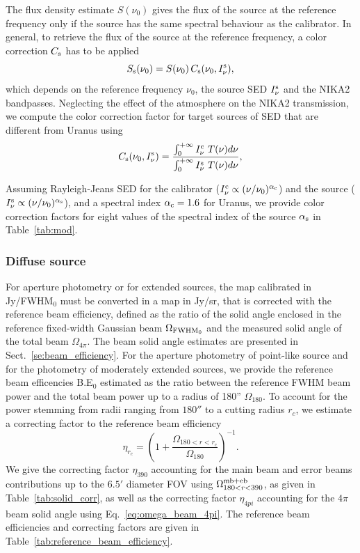 The flux density estimate $S(\nu_{0})$ gives the
flux of the source at the reference frequency only if the source has
the same spectral behaviour as the calibrator. In general, to retrieve the
flux of the source at the reference frequency, a color correction
$C_{\rm{s}}$ has to be applied
\begin{equation}
S_{\rm{s}}(\nu_{0}) = S(\nu_{0}) \,  C_{\rm{s}}(\nu_{0}, I_\nu^{\rm{s}}),
\end{equation}
which depends on the reference frequency $\nu_{0}$, the source
SED $I_\nu^{\rm{s}}$ and the NIKA2 bandpasses.
Neglecting the effect of the atmosphere on the NIKA2 transmission, we
compute the color correction factor for target sources of SED that are
different from Uranus using
\begin{equation}
  C_{\rm{s}}(\nu_{0}, I_\nu^{\rm{s}}) = \frac{\int_{0}^{+\infty} I_\nu^{\rm{c}}~T({\nu}) d\nu}{ \int_{0}^{+\infty} I_\nu^{\rm{s}}~ T({\nu}) d\nu},
    \label{eq:color_correction}
\end{equation}

Assuming Rayleigh-Jeans SED for the calibrator
($I_\nu^{\rm{c}} \propto (\nu/\nu_0)^{\alpha_{\rm{c}}}$) and the source
($I_\nu^{\rm{s}} \propto (\nu/\nu_0)^{\alpha_{\rm{s}}}$), and a
spectral index $\alpha_{\rm{c}} = 1.6$ for Uranus, we provide color
correction factors for eight values of the spectral index of the
source $\alpha_{\rm{s}}$ in Table~\ref{tab:mod}.


\subsubsection{Diffuse source}
\label{se:extended_source_calib}

For aperture photometry or for extended sources, the map calibrated in
Jy/FWHM$_{0}$ must be converted in a map in Jy/sr, that is corrected
with the reference beam efficiency, defined as the ratio of the solid
angle enclosed in the reference fixed-width Gaussian beam
$\Omega_{\rm{FWHM}_{0}}$ and the measured solid angle of the total
beam $\Omega_{4\pi}$. The beam solid angle estimates are
presented in Sect.~\ref{se:beam_efficiency}.
{\lp For the aperture photometry of point-like source and for the
photometry of moderately extended sources, we provide the reference
beam efficencies B.E$_{0}$ estimated as the ratio between the
reference FWHM beam power and the total beam power up to a radius of
180'' $\Omega_{180}$. To account for the power stemming from radii
ranging from $180''$ to a cutting radius $r_c$, we estimate a
correcting factor to the reference beam efficiency 
\begin{equation}
\eta_{r_c} = \left( 1 + \frac{\Omega_{180<r<r_c}}{\Omega_{180}} \right)^{-1}.
\end{equation}
We give the correcting factor $\eta_{390}$ accounting for the main
beam and error beams contributions up to the $6.5'$ diameter FOV
using $\Omega_{180<r<390}^{\rm{mb+eb}}$, as given in
Table~\ref{tab:solid_corr}, as well as the correcting factor
$\eta_{4pi}$ accounting for the $4\pi$ beam
solid angle using Eq.~\ref{eq:omega_beam_4pi}. The reference beam efficiencies
 and correcting factors are given in Table~\ref{tab:reference_beam_efficiency}.
}

